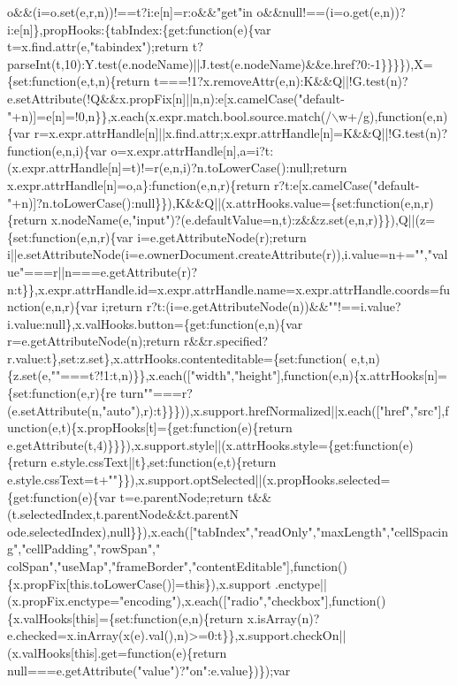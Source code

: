 \begin{DoxyCode}
{       o&&(i=o.set(e,r,n))!==t?i:e[n]=r:o&&"get"in o&&null!==(i=o.get(e,n))?i:e[n]\},propHooks:\{tabIndex:\{get:function(e)\{var
       t=x.find.attr(e,"tabindex");return
       t?parseInt(t,10):Y.test(e.nodeName)||J.test(e.nodeName)&&e.href?0:-1\}\}\}\}),X=\{set:function(e,t,n)\{return
       t===!1?x.removeAttr(e,n):K&&Q||!G.test(n)?e.setAttribute(!Q&&x.propFix[n]||n,n):e[x.camelCase("default-"+n)]=e[n]=!0,n\}\},x.each(x.expr.match.bool.source.match(/\(\backslash\)w+/g),function(e,n)\{var
       r=x.expr.attrHandle[n]||x.find.attr;x.expr.attrHandle[n]=K&&Q||!G.test(n)?function(e,n,i)\{var
       o=x.expr.attrHandle[n],a=i?t:(x.expr.attrHandle[n]=t)!=r(e,n,i)?n.toLowerCase():null;return x.expr.attrHandle[n]=o,a\}:function(e,n,r)\{return
       r?t:e[x.camelCase("default-"+n)]?n.toLowerCase():null\}\}),K&&Q||(x.attrHooks.value=\{set:function(e,n,r)\{return
       x.nodeName(e,"input")?(e.defaultValue=n,t):z&&z.set(e,n,r)\}\}),Q||(z=\{set:function(e,n,r)\{var
       i=e.getAttributeNode(r);return
       i||e.setAttributeNode(i=e.ownerDocument.createAttribute(r)),i.value=n+="","value"===r||n===e.getAttribute(r)?n:t\}\},x.expr.attrHandle.id=x.expr.attrHandle.name=x.expr.attrHandle.coords=function(e,n,r)\{var
       i;return r?t:(i=e.getAttributeNode(n))&&""!==i.value?i.value:null\},x.valHooks.button=\{get:function(e,n)\{var
       r=e.getAttributeNode(n);return
       r&&r.specified?r.value:t\},set:z.set\},x.attrHooks.contenteditable=\{set:function(
      e,t,n)\{z.set(e,""===t?!1:t,n)\}\},x.each(["width","height"],function(e,n)\{x.attrHooks[n]=\{set:function(e,r)\{re
      turn""===r?(e.setAttribute(n,"auto"),r):t\}\}\})),x.support.hrefNormalized||x.each(["href","src"],function(e,t)\{x.propHooks[t]=\{get:function(e)\{return
       e.getAttribute(t,4)\}\}\}),x.support.style||(x.attrHooks.style=\{get:function(e)\{return e.style.cssText||t\},set:function(e,t)\{return
       e.style.cssText=t+""\}\}),x.support.optSelected||(x.propHooks.selected=\{get:function(e)\{var t=e.parentNode;return
       t&&(t.selectedIndex,t.parentNode&&t.parentN
      ode.selectedIndex),null\}\}),x.each(["tabIndex","readOnly","maxLength","cellSpacing","cellPadding","rowSpan","
      colSpan","useMap","frameBorder","contentEditable"],function()\{x.propFix[this.toLowerCase()]=this\}),x.support
      .enctype||(x.propFix.enctype="encoding"),x.each(["radio","checkbox"],function()\{x.valHooks[this]=\{set:function(e,n)\{return
       x.isArray(n)?e.checked=x.inArray(x(e).val(),n)>=0:t\}\},x.support.checkOn||(x.valHooks[this].get=function(e)\{return null===e.getAttribute("value")?"on":e.value\})\});var
}
\end{DoxyCode}

